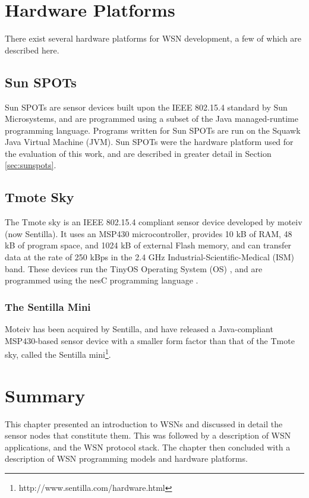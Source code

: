 \section{Hardware Platforms}

There exist several hardware platforms for WSN development, a few of which are
described here.

\subsection{Sun SPOTs}

Sun SPOTs \cite{simon_squawk:2006,sun_developer:2008} are sensor devices built
upon the IEEE 802.15.4 standard by Sun
Microsystems, and are programmed using a subset of the Java managed-runtime
programming
language. Programs written for Sun SPOTs are run on the Squawk Java Virtual
Machine (JVM). Sun SPOTs were the hardware platform used for the evaluation of
this work, and are described in greater detail in Section \ref{sec:sunspots}.

\subsection{Tmote Sky}

The Tmote sky is an IEEE 802.15.4 compliant sensor device
\cite{tmote_sky_brochure:xxxx} developed by moteiv
(now Sentilla). It uses an MSP430 microcontroller, provides 10 kB of RAM,
48 kB of program space, and 1024 kB of external Flash memory, and can transfer
data at the rate of 250 kBps in the 2.4 GHz Industrial-Scientific-Medical (ISM)
band. These devices run the TinyOS Operating System (OS) \cite{levis_tinyos:2005}, and are programmed
using the nesC programming language \cite{gay_nesc}.

\subsubsection{The Sentilla Mini}

Moteiv has been acquired by Sentilla, and have released a Java-compliant 
MSP430-based sensor
device with a smaller form factor than that of the Tmote sky, called the
Sentilla mini\footnote{http://www.sentilla.com/hardware.html}.

\section{Summary}
This chapter presented an introduction to WSNs and discussed in detail the 
sensor nodes that constitute them. This was followed by a description of WSN
applications, and the
WSN protocol stack. The chapter then concluded with a description of WSN
programming models and hardware platforms.